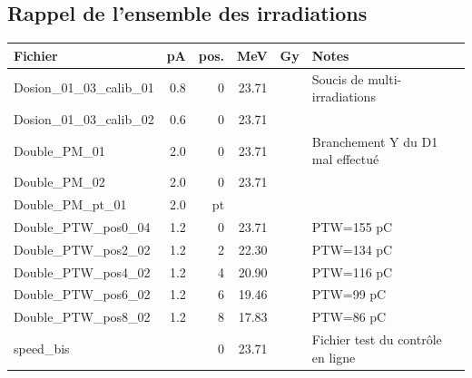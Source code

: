 \documentclass[a4paper,11pt]{article}
\begin{document}
\subsection*{Rappel de l'ensemble des irradiations}
\begin{center}
\begin{tabular}{lrrrrl}
Fichier&pA&pos.&MeV&Gy&Notes\\
\hline
\hline
Dosion\_01\_03\_calib\_01&0.8&0&23.71&&Soucis de multi-irradiations\\
Dosion\_01\_03\_calib\_02&0.6&0&23.71&&\\
Double\_PM\_01&2.0&0&23.71&&Branchement Y du D1 mal effectué\\
Double\_PM\_02&2.0&0&23.71&&\\
Double\_PM\_pt\_01&2.0&pt&&&\\
Double\_PTW\_pos0\_04&1.2&0&23.71&&PTW=155 pC\\
Double\_PTW\_pos2\_02&1.2&2&22.30&&PTW=134 pC\\
Double\_PTW\_pos4\_02&1.2&4&20.90&&PTW=116 pC\\
Double\_PTW\_pos6\_02&1.2&6&19.46&&PTW=99 pC\\
Double\_PTW\_pos8\_02&1.2&8&17.83&&PTW=86 pC\\
speed\_bis&&0&23.71&&Fichier test du contrôle en ligne\\
\hline
\end{tabular}
\end{center}


\end{document}
